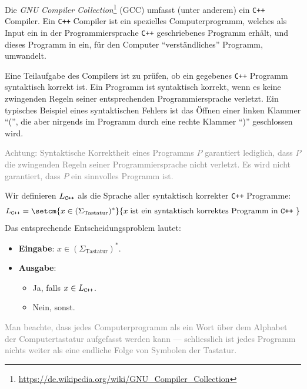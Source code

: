 \begin{myexample}\label{myexample:check_program}
Die \textit{GNU Compiler Collection}\footnote{\url{https://de.wikipedia.org/wiki/GNU_Compiler_Collection}} (GCC) umfasst (unter anderem) ein {\tt C++} Compiler. Ein {\tt C++} Compiler ist ein spezielles Computerprogramm, welches als Input ein in der Programmiersprache {\tt C++} geschriebenes Programm erhält, und dieses Programm in ein, für den Computer \enquote{verständliches} Programm, umwandelt.

Eine Teilaufgabe des Compilers ist zu prüfen, ob ein gegebenes {\tt C++} Programm syntaktisch korrekt ist. Ein Programm ist syntaktisch korrekt, wenn es keine zwingenden Regeln seiner entsprechenden Programmiersprache verletzt. Ein typisches Beispiel eines syntaktischen Fehlers ist das Öffnen einer linken Klammer \enquote{(}, die aber nirgends im Programm durch eine rechte Klammer \enquote{)} geschlossen wird.

\textcolor{Gray}{Achtung: Syntaktische Korrektheit eines Programms $P$ garantiert lediglich, dass $P$ die zwingenden Regeln seiner Programmiersprache nicht verletzt. Es wird nicht garantiert, dass $P$ ein sinnvolles Programm ist.}

Wir definieren $L_{\text{{\tt C++}}}$ als die Sprache aller syntaktisch korrekter {\tt C++} Programme:
\begin{align*}
	L_{\text{{\tt C++}}} = \setcm{x\in(\Sigma_{\text{Tastatur}})^*}{x\;\text{ist ein syntaktisch korrektes Programm in {\tt C++} }}
\end{align*}
Das entsprechende Entscheidungsproblem lautet:
\begin{itemize}
	\item \textbf{Eingabe}: $x\in(\Sigma_{\text{Tastatur}})^*$.
	\item \textbf{Ausgabe}:
	      \begin{itemize}
		      \item Ja, falls $x\in L_{\text{{\tt C++}}}$.
		      \item Nein, sonst.
	      \end{itemize}
\end{itemize}
\textcolor{Gray}{Man beachte, dass jedes Computerprogramm als ein Wort über dem Alphabet der Computertastatur aufgefasst werden kann --- schliesslich ist jedes Programm nichts weiter als eine endliche Folge von Symbolen der Tastatur.}
\end{myexample}

